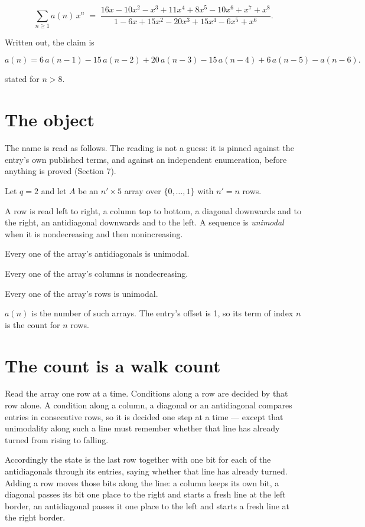 \documentclass[11pt]{article}
\theoremstyle{definition}
\begin{document}
\[\sum_{n \ge 1} a(n)\,x^n \;=\; \frac{16x - 10x^{2} - x^{3} + 11x^{4} + 8x^{5} - 10x^{6} + x^{7} + x^{8}}{1 - 6x + 15x^{2} - 20x^{3} + 15x^{4} - 6x^{5} + x^{6}}.\]

Written out, the claim is

\[a(n) = 6\,a(n-1) - 15\,a(n-2) + 20\,a(n-3) - 15\,a(n-4) + 6\,a(n-5) - a(n-6).\]

stated for $n > 8$.

\section{The object}

The name is read as follows. The reading is not a guess: it is pinned against the entry's own published terms, and against an independent enumeration, before anything is proved (Section 7).

Let $q = 2$ and let $A$ be an $n' \times 5$ array over $\{0,\dots,1\}$ with $n' = n$ rows.

A row is read left to right, a column top to bottom, a diagonal downwards and to the right, an antidiagonal downwards and to the left. A sequence is {\itshape unimodal} when it is nondecreasing and then nonincreasing.

Every one of the array's antidiagonals is unimodal.

Every one of the array's columns is nondecreasing.

Every one of the array's rows is unimodal.

$a(n)$ is the number of such arrays. The entry's offset is 1, so its term of index $n$ is the count for $n$ rows.

\section{The count is a walk count}

Read the array one row at a time. Conditions along a row are decided by that row alone. A condition along a column, a diagonal or an antidiagonal compares entries in consecutive rows, so it is decided one step at a time --- except that unimodality along such a line must remember whether that line has already turned from rising to falling.

Accordingly the state is the last row together with one bit for each of the antidiagonals through its entries, saying whether that line has already turned. Adding a row moves those bits along the line: a column keeps its own bit, a diagonal passes its bit one place to the right and starts a fresh line at the left border, an antidiagonal passes it one place to the left and starts a fresh line at the right border.
\end{document}
